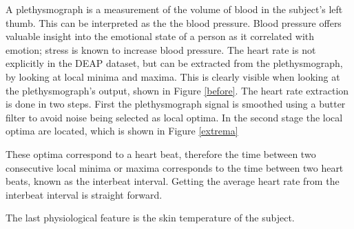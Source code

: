\npar
A plethysmograph is a measurement of the volume of blood in the subject's left thumb. This can be interpreted as the the blood pressure. Blood pressure offers valuable insight into the emotional state of a person as it correlated with emotion; stress is known to increase blood pressure\citep{DEAP}.
\npar
The heart rate is not explicitly in the DEAP dataset, but can be extracted from the plethysmograph, by looking at local minima and maxima\citep{DEAP}. This is clearly visible when looking at the plethysmograph's output, shown in Figure \ref{before}.
\npar
The heart rate extraction is done in two steps. First the plethysmograph signal is smoothed using a butter filter to avoid noise being selected as local optima. In the second stage the local optima are located, which is shown in Figure \ref{extrema}


\npar

These optima correspond to a heart beat, therefore the time between two consecutive local minima or maxima corresponds to the time between two heart beats, known as the interbeat interval. Getting the average heart rate from the interbeat interval is straight forward.

The last physiological feature is the skin temperature of the subject.